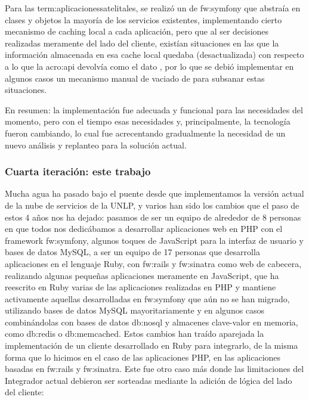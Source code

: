 Para las \gls{term:aplicacionessatelitales}, se realizó un  de \gls{fw:symfony} que abstraía en clases y objetos la mayoría de los servicios existentes, implementando cierto mecanismo de caching local a cada aplicación, pero que al ser decisiones realizadas meramente del lado del cliente, existían situaciones en las que la información almacenada en esa cache local quedaba  (desactualizada) con respecto a lo que la \gls{acro:api} devolvía como el dato , por lo que se debió implementar en algunos casos un mecanismo manual de vaciado de  para subsanar estas situaciones.

En resumen: la implementación fue adecuada y funcional para las necesidades del momento, pero con el tiempo esas necesidades y, principalmente, la tecnología fueron cambiando, lo cual fue acrecentando gradualmente la necesidad de un nuevo análisis y replanteo para la solución actual.


\subsubsection{Cuarta iteración: este trabajo}
\label{nube:etapa4}

Mucha agua ha pasado bajo el puente desde que implementamos la versión actual de la nube de servicios de la UNLP, y varios han sido los cambios que el paso de estos 4 años nos ha dejado: pasamos de ser un equipo de alrededor de 8 personas en que todos nos dedicábamos a desarrollar aplicaciones web en PHP con el framework \gls{fw:symfony}, algunos toques de JavaScript para la interfaz de usuario y bases de datos MySQL, a ser un equipo de 17 personas que desarrolla aplicaciones en el lenguaje Ruby, con \gls{fw:rails} y \gls{fw:sinatra} como  web de cabecera, realizando algunas pequeñas aplicaciones meramente en JavaScript, que ha reescrito en Ruby varias de las aplicaciones realizadas en PHP y mantiene activamente aquellas desarrolladas en \gls{fw:symfony} que aún no se han migrado, utilizando bases de datos MySQL mayoritariamente y en algunos casos combinándolas con bases de datos \gls{db:nosql} y almacenes clave-valor en memoria, como \gls{db:redis} o \gls{db:memcached}. Estos cambios han traído aparejada la implementación de un cliente desarrollado en Ruby para integrarlo, de la misma forma que lo hicimos en el caso de las aplicaciones PHP, en las aplicaciones basadas en \gls{fw:rails} y \gls{fw:sinatra}. Este fue otro caso más donde las limitaciones del Integrador actual debieron ser sorteadas mediante la adición de lógica del lado del cliente:

